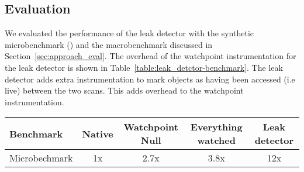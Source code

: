 

\subsection{Evaluation}
We evaluated the performance of the leak detector with the synthetic microbenchmark () and the macrobenchmark discussed in Section~\ref{sec:approach_eval}. The overhead of the watchpoint instrumentation for the leak detector is shown in Table~\ref{table:leak_detctor-benchmark}. The leak detector adds extra instrumentation to mark objects as having been accessed (i.e live) between the two scans. This adds overhead to the watchpoint instrumentation. 

\begin{table*}
\begin{center}
\begin{tabular}{|l|c c c c|}
  \hline
  Benchmark & Native & Watchpoint Null & Everything watched & Leak detector\\
  \hline
  Microbechmark  & 1x & 2.7x & 3.8x & 12x\\
  \hline
\end{tabular}
\caption[Performance impact of leak detector on microbenchmark.]{\label{table:leak_detctor-benchmark}The overhead of watchpoint instrumentation for the leak detector on our microbechmark in shown . The leak detector uses instrumentation to mark live objects between the scans.}
\end{center}
\end{table*}

